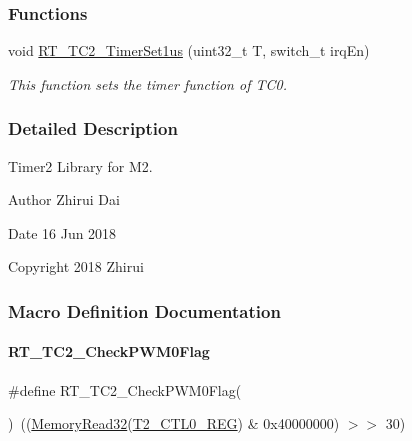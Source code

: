 \subsubsection*{Functions}
\begin{DoxyCompactItemize}
\item 
void \mbox{\hyperlink{a00047_a295c11e348fa97400f36ddf1ece55368}{R\+T\+\_\+\+T\+C2\+\_\+\+Timer\+Set1us}} (uint32\+\_\+t T, switch\+\_\+t irq\+En)
\begin{DoxyCompactList}\small\item\em This function sets the timer function of T\+C0. \end{DoxyCompactList}\end{DoxyCompactItemize}


\subsubsection{Detailed Description}
Timer2 Library for M2. 

\begin{DoxyAuthor}{Author}
Zhirui Dai 
\end{DoxyAuthor}
\begin{DoxyDate}{Date}
16 Jun 2018 
\end{DoxyDate}
\begin{DoxyCopyright}{Copyright}
2018 Zhirui 
\end{DoxyCopyright}


\subsubsection{Macro Definition Documentation}
\mbox{\label{a00047_a68bc636dca2736a8368cfd72ca9eb11a}} 
\paragraph{\texorpdfstring{R\+T\+\_\+\+T\+C2\+\_\+\+Check\+P\+W\+M0\+Flag}{RT\_TC2\_CheckPWM0Flag}}
{\footnotesize\ttfamily \#define R\+T\+\_\+\+T\+C2\+\_\+\+Check\+P\+W\+M0\+Flag(\begin{DoxyParamCaption}{ }\end{DoxyParamCaption})~((\mbox{\hyperlink{a00020_a2d484dc15bdf30ee11ab3b05f31f0e16}{Memory\+Read32}}(\mbox{\hyperlink{a00020_adadaa0ab1ebbd7ba9b70dfd24c3ed44daf2e9deb36631241181cbf09e8d959475}{T2\+\_\+\+C\+T\+L0\+\_\+\+R\+EG}}) \& 0x40000000) $>$$>$ 30)}



